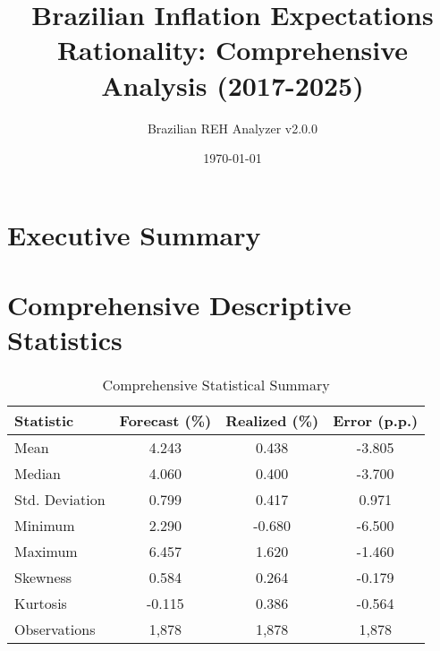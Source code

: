 \documentclass[11pt,a4paper]{article}
\title{Brazilian Inflation Expectations Rationality: Comprehensive Analysis (2017-2025)}
\author{Brazilian REH Analyzer v2.0.0}
\date{\today}
\begin{document}
\maketitle

\section{Executive Summary}

\begin{center}
\end{center}

\section{Comprehensive Descriptive Statistics}

\begin{table}[H]
\centering
\caption{Comprehensive Statistical Summary}
\begin{tabular}{lccc}
\toprule
\textbf{Statistic} & \textbf{Forecast (\%)} & \textbf{Realized (\%)} & \textbf{Error (p.p.)} \\
\midrule
Mean & 4.243 & 0.438 & -3.805 \\
Median & 4.060 & 0.400 & -3.700 \\
Std. Deviation & 0.799 & 0.417 & 0.971 \\
Minimum & 2.290 & -0.680 & -6.500 \\
Maximum & 6.457 & 1.620 & -1.460 \\
Skewness & 0.584 & 0.264 & -0.179 \\
Kurtosis & -0.115 & 0.386 & -0.564 \\
Observations & 1,878 & 1,878 & 1,878 \\
\bottomrule
\end{tabular}
\end{table}
\end{document}
